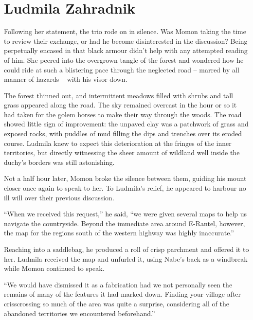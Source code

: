 \chapter{Ludmila Zahradnik}

Following her statement, the trio rode on in silence. Was Momon taking the time to review their exchange, or had he become disinterested in the discussion? Being perpetually encased in that black armour didn’t help with any attempted reading of him. She peered into the overgrown tangle of the forest and wondered how he could ride at such a blistering pace through the neglected road – marred by all manner of hazards – with his visor down.

 

The forest thinned out, and intermittent meadows filled with shrubs and tall grass appeared along the road. The sky remained overcast in the hour or so it had taken for the golem horses to make their way through the woods. The road showed little sign of improvement: the unpaved clay was a patchwork of grass and exposed rocks, with puddles of mud filling the dips and trenches over its eroded course. Ludmila knew to expect this deterioration at the fringes of the inner territories, but directly witnessing the sheer amount of wildland well inside the duchy’s borders was still astonishing.

 

Not a half hour later, Momon broke the silence between them, guiding his mount closer once again to speak to her. To Ludmila’s relief, he appeared to harbour no ill will over their previous discussion.

 

“When we received this request,” he said, “we were given several maps to help us navigate the countryside. Beyond the immediate area around E-Rantel, however, the map for the regions south of the western highway was highly inaccurate.”

 

Reaching into a saddlebag, he produced a roll of crisp parchment and offered it to her. Ludmila received the map and unfurled it, using Nabe’s back as a windbreak while Momon continued to speak.

 

“We would have dismissed it as a fabrication had we not personally seen the remains of many of the features it had marked down. Finding your village after crisscrossing so much of the area was quite a surprise, considering all of the abandoned territories we encountered beforehand.”

